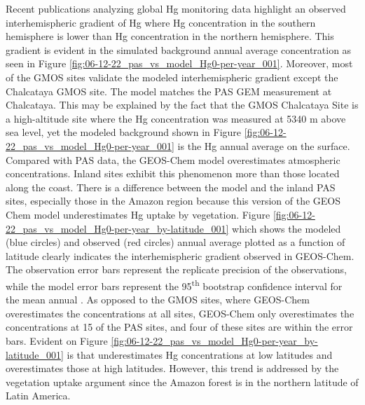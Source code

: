 \begin{flushleft}
 Recent publications analyzing global Hg monitoring data highlight an observed interhemispheric gradient of Hg where Hg concentration in the southern hemisphere is lower than Hg concentration in the northern hemisphere\cite{sprovieri_atmospheric_2016}. This gradient is evident in the simulated background annual average \hg concentration as seen in Figure \ref{fig:06-12-22_pas_vs_model_Hg0-per-year_001}. Moreover, most of the GMOS sites validate the modeled interhemispheric gradient except the Chalcataya GMOS site. The model matches the PAS GEM measurement at Chalcataya. This may be explained by the fact that the GMOS Chalcataya Site is a high-altitude site where the Hg concentration was measured at 5340 m above sea level, yet the modeled background shown in Figure \ref{fig:06-12-22_pas_vs_model_Hg0-per-year_001} is the Hg annual average on the surface. Compared with PAS data, the GEOS-Chem model overestimates atmospheric concentrations. Inland sites exhibit this phenomenon more than those located along the coast. There is a difference between the model and the inland PAS sites, especially those in the Amazon region because this version of the GEOS Chem model underestimates Hg uptake by vegetation. Figure \ref{fig:06-12-22_pas_vs_model_Hg0-per-year_by-latitude_001} which shows the modeled (blue circles) and observed (red circles) annual average \hg plotted as a function of latitude clearly indicates the interhemispheric gradient observed in GEOS-Chem. The observation error bars represent the replicate precision of the observations, while the model error bars represent the 95\textsuperscript{th} bootstrap confidence interval for the mean annual \hg. As opposed to the GMOS sites, where GEOS-Chem overestimates the concentrations at all sites, GEOS-Chem only overestimates the concentrations at 15 of the PAS sites, and four of these sites are within the error bars. Evident on Figure \ref{fig:06-12-22_pas_vs_model_Hg0-per-year_by-latitude_001}  is that \gc underestimates Hg concentrations at low latitudes and overestimates those at high latitudes. However, this trend is addressed by the vegetation uptake argument since the Amazon forest is in the northern latitude of Latin America.
\end{flushleft}

